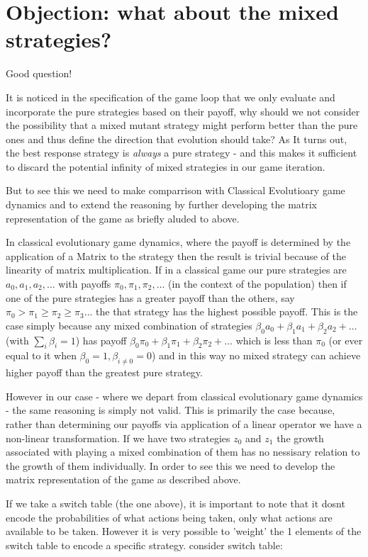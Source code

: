 \documentclass[journal,article,accept,oneauthors,pdftex,10pt,a4paper]{mdpi}
\begin{document}
\section{Objection: what about the mixed strategies?}

Good question!

It is noticed in the specification of the game loop that we only evaluate and incorporate the pure strategies based on their payoff, why should we not consider the possibility that a mixed mutant strategy might perform better than the pure ones and thus define the direction that evolution should take?
As It turns out, the best response strategy is \textit{always} a pure strategy - and this makes it sufficient to discard the potential infinity of mixed strategies in our game iteration.

But to see this we need to make comparrison with Classical Evolutioary game dynamics and to extend the reasoning by further developing the matrix representation of the game as briefly aluded to above.

In classical evolutionary game dynamics, where the payoff is determined by the application of a Matrix to the strategy then the result is trivial because of the linearity of matrix multiplication.
If in a classical game our pure strategies are $a_0,a_1,a_2,\dots$ with payoffs $\pi_0,\pi_1,\pi_2,\dots$ (in the context of the population) then if one of the pure strategies has a greater payoff than the others, say $\pi_0>\pi_1\ge\pi_2\ge\pi_3\dots$ the that strategy has the highest possible payoff.
This is the case simply because any mixed combination of strategies $\beta_0a_0+\beta_1a_1+\beta_2a_2+\dots$ (with $\sum_i\beta_i=1$) has payoff $\beta_0\pi_0+\beta_1\pi_1+\beta_2\pi_2+\dots$ which is less than $\pi_0$ (or ever equal to it when $\beta_0=1,\beta_{i\ne0}=0$) and in this way no mixed strategy can achieve higher payoff than the greatest pure strategy.

However in our case - where we depart from classical evolutionary game dynamics - the same reasoning is simply not valid.
This is primarily the case because, rather than determining our payoffs via application of a linear operator we have a non-linear transformation.
If we have two strategies $z_0$ and $z_1$ the growth associated with playing a mixed combination of them has no nessisary relation to the growth of them individually.
In order to see this we need to develop the matrix representation of the game as described above.

If we take a switch table (the one above), it is important to note that it dosnt encode the probabilities of what actions being taken, only what actions are available to be taken.
However it is very possible to 'weight' the 1 elements of the switch table to encode a specific strategy.
consider switch table:
\end{document}
